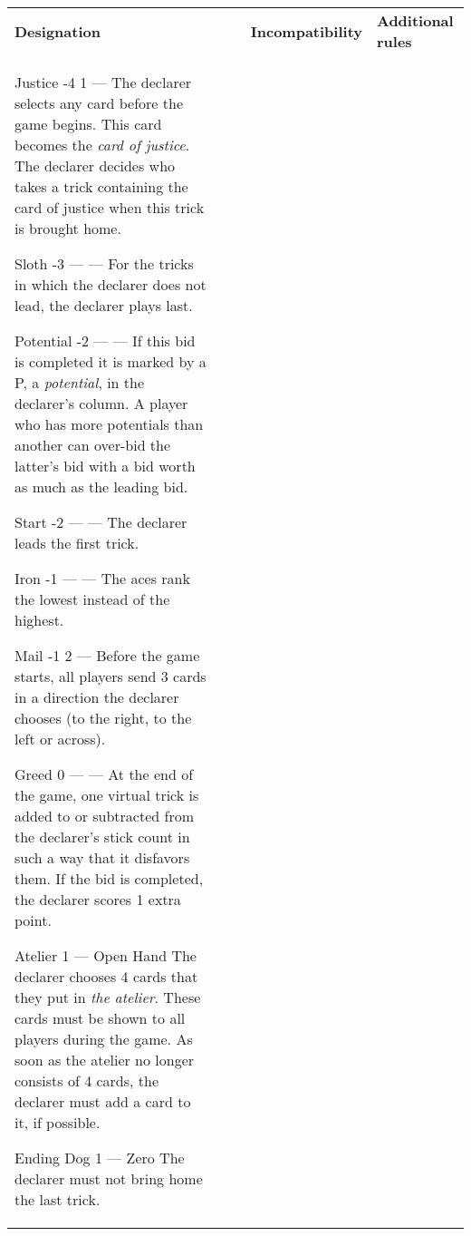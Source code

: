 	\begin{center}
		\begin{tabularx}{\textwidth}{
			l
			S[table-number-alignment=center, table-format=1.0]
			S[table-number-alignment=center, table-format=1.0]
			p{3cm}
			|X
		}
			\textbf{Designation} &
			 &
			 &
			\textbf{Incompatibility} &
			\textbf{Additional rules}
			\\[-3ex]

			\specialBidItem%
			{Justice}
			{-4}
			{1}
			{---}
			{%
				The declarer selects any card before the game begins. This card becomes the \emph{card of justice}. The declarer decides who takes a trick containing the card of justice when this trick is brought home.
			}

			\specialBidItem%
			{Sloth}
			{-3}
			{{---}}
			{---}
			{%
				For the tricks in which the declarer does not lead, the declarer plays last.
			}

			\specialBidItem%
			{Potential}
			{-2}
			{{---}}
			{---}
			{%
				If this bid is completed it is marked by a P, a \emph{potential}, in the declarer's column. A player who has more potentials than another can over-bid the latter's bid with a bid worth as much as the leading bid.
			}

			\specialBidItem%
			{Start}
			{-2}
			{{---}}
			{---}
			{%
				The declarer leads the first trick.
			}

			\specialBidItem%
			{Iron}
			{-1}
			{{---}}
			{---}
			{%
				The aces rank the lowest instead of the highest.
			}

			\specialBidItem%
			{Mail}
			{-1}
			{2}
			{---}
			{%
				Before the game starts, all players send 3 cards in a direction the declarer chooses (to the right, to the left or across).
			}

			\specialBidItem%
			{Greed}
			{0}
			{{---}}
			{---}
			{%
				At the end of the game, one virtual trick is added to or subtracted from the declarer's stick count in such a way that it disfavors them. If the bid is completed, the declarer scores 1 extra point.
			}

			\specialBidItem%
			{Atelier}
			{1}
			{{---}}
			{Open Hand}
			{%
				The declarer chooses 4 cards that they put in \emph{the atelier}. These cards must be shown to all players during the game. As soon as the atelier no longer consists of 4 cards, the declarer must add a card to it, if possible.
			}

			\specialBidItem%
			{Ending Dog}
			{1}
			{{---}}
			{Zero}
			{%
				The declarer must not bring home the last trick.
			}


\end{tabularx}
\end{center}
